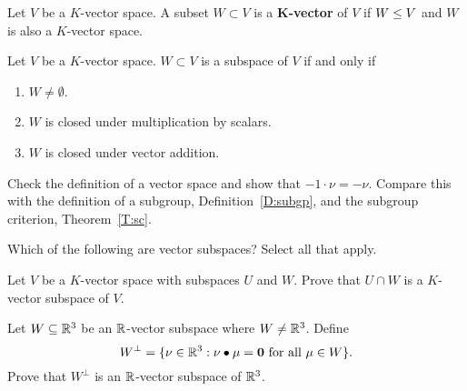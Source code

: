 \documentclass{ximera}
\begin{document}
\begin{definition}
  Let $V$ be a $K$-vector space. A subset $W\subset V$ is a
  \textbf{$\boldsymbol K$-vector}  of $V$ if $W\leq V$ and $W$
  is also a $K$-vector space.
\end{definition}

\begin{lemma}
  Let $V$ be a $K$-vector space. $W\subset V$ is a subspace of $V$ if
  and only if
  \begin{enumerate}
  \item $W\ne \emptyset$.
  \item $W$ is closed under multiplication by scalars.
  \item $W$ is closed under vector addition.
  \end{enumerate}
  \begin{sketch}
    Check the definition of a vector space and show that $-1\cdot \nu=
    -\nu$. Compare this with the definition of a subgroup,
    Definition~\ref{D:subgp}, and the subgroup criterion, Theorem~\ref{T:sc}.
  \end{sketch}
\end{lemma}

\begin{exercise}
  Which of the following are vector subspaces? Select all that apply.
  \begin{selectAll}
  \end{selectAll}
\end{exercise}


\begin{exercise}
  Let $V$ be a $K$-vector space with subspaces $U$ and $W$. Prove that
  $U\cap W$ is a $K$-vector subspace of $V$.
\end{exercise}

\begin{exercise}
  Let $W\subseteq \mathbb R^3$ be an $\mathbb R$-vector subspace where $W\ne \mathbb R^3$.
  Define
  \[
  W^\perp = \{\nu\in\mathbb R^3: \nu \bullet \mu = \mathbf{0}\text{ for all $\mu\in W$} \}.
  \]
  Prove that $W^\perp$ is an $\mathbb R$-vector subspace of $\mathbb R^3$.
\end{exercise}
\end{document}
